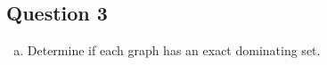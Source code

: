 \documentclass[12pt]{article}
\begin{document}
\subsection*{Question 3}
\begin{enumerate}[(a)]
	

	
	\item Determine if each graph has an exact dominating set.
	\begin{figure}[h]
    \centering
    \qquad
    \\
    \qquad
	\end{figure}


\end{enumerate}
\end{document}
